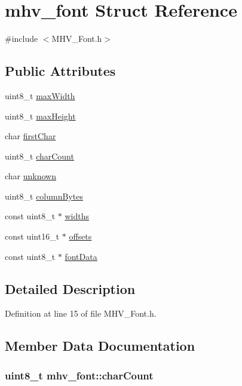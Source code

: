 \hypertarget{structmhv__font}{\section{mhv\-\_\-font Struct Reference}
\label{structmhv__font}
}


{\ttfamily \#include $<$M\-H\-V\-\_\-\-Font.\-h$>$}

\subsection*{Public Attributes}
\begin{DoxyCompactItemize}
\item 
uint8\-\_\-t \hyperlink{structmhv__font_a21edb005a94690dc33615312f21640d0}{max\-Width}
\item 
uint8\-\_\-t \hyperlink{structmhv__font_aa15b52666692c10a27f9b5fcbed78780}{max\-Height}
\item 
char \hyperlink{structmhv__font_a675ce1bde33e6b62a4aff2ba955e61c7}{first\-Char}
\item 
uint8\-\_\-t \hyperlink{structmhv__font_a94db16004d6b4d91da0baf4d16c1952a}{char\-Count}
\item 
char \hyperlink{structmhv__font_a2df18aa9aae6fbbd346b07084eb7f5af}{unknown}
\item 
uint8\-\_\-t \hyperlink{structmhv__font_aee0716d7afae1a161ddab7859aebeb6b}{column\-Bytes}
\item 
const uint8\-\_\-t $\ast$ \hyperlink{structmhv__font_a27b1d6f8273b5c47331c56dc2fa99d39}{widths}
\item 
const uint16\-\_\-t $\ast$ \hyperlink{structmhv__font_abf40bd8aecc79834ae9a010a25de1ecd}{offsets}
\item 
const uint8\-\_\-t $\ast$ \hyperlink{structmhv__font_a2143c1f24a538699b21c26a0e848061e}{font\-Data}
\end{DoxyCompactItemize}


\subsection{Detailed Description}


Definition at line 15 of file M\-H\-V\-\_\-\-Font.\-h.



\subsection{Member Data Documentation}
\hypertarget{structmhv__font_a94db16004d6b4d91da0baf4d16c1952a}{
\subsubsection[{char\-Count}]{\setlength{\rightskip}{0pt plus 5cm}uint8\-\_\-t mhv\-\_\-font\-::char\-Count}}\label{structmhv__font_a94db16004d6b4d91da0baf4d16c1952a}


